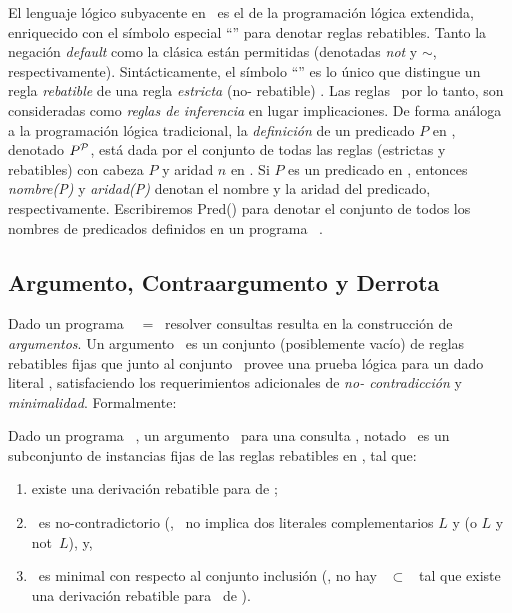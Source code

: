  El lenguaje lógico subyacente en \DLP\ es el de la programación lógica
 extendida, enriquecido con el símbolo especial ``\drule{}{}'' para
 denotar reglas rebatibles. Tanto la negación  \textit{default} como la
 clásica están permitidas (denotadas \textit{not} y \textit{$\sim$},
 respectivamente). Sintácticamente, el símbolo ``\drule{}{}'' es lo
 único que distingue un regla \textit{rebatible}
  de una regla \textit{estricta} (no-
 rebatible) .  Las reglas \DLP\, por lo tanto,
 son consideradas como \textit{reglas de inferencia} en lugar
 implicaciones. De forma análoga a la programación lógica tradicional,
 la \textit{definición} de un predicado $P$ en \PP , denotado
 $P^{\scriptsize{\mbox{${\mathcal P}$}}}$, está dada por el conjunto de todas las reglas
 (estrictas y rebatibles) con cabeza $P$  y aridad $n$ en \PP . Si $P$
 es un predicado en \PP , entonces \textit{nombre(P)} y
 \textit{aridad(P)} denotan el nombre y la aridad del predicado,
 respectivamente. Escribiremos \textsf{Pred}(\PP) para denotar el
 conjunto de todos los nombres de predicados definidos en un programa
 \DLP\ \PP.

\subsection{Argumento, Contraargumento y Derrota}
\label{sub:argumento_contraargumento_derrota}
 
 Dado un programa \DLP\ \PP\ = \SD\, resolver consultas resulta en la
 construcción de \textit{argumentos}. Un argumento \ArgA\ es un
 conjunto (posiblemente vacío) de reglas rebatibles fijas que junto al
 conjunto \SSet\  provee una prueba lógica para un dado literal \ArgQ,
 satisfaciendo los requerimientos adicionales de  \textit{no-
 contradicción} y \textit{minimalidad}. Formalmente:
 
 \begin{definicion}[Argumento]
 \label{def:argumento}
 
 Dado un programa \DLP\ \PP, un argumento \ArgA\ para una consulta
 \ArgQ, notado \AQ\, es un subconjunto de  instancias fijas de las
 reglas rebatibles en \PP, tal que:
    
 \begin{enumerate}[(1)]
 \item existe una derivación rebatible para \ArgQ de \SyA;
 
 \item \SyA\ es no-contradictorio (\ie, \SyA\ no implica dos literales
 complementarios $L$ y  (o $L$ y \textsf{not}\ $L$), y,
 
 \item \ArgA\ es minimal con respecto al conjunto inclusión (\ie, no
 hay \Ap\ $\subset$ \ArgA\ tal que existe una derivación rebatible para
 \ArgQ\ de \SyAp).
 
 \end{enumerate}
 \end{definicion}

